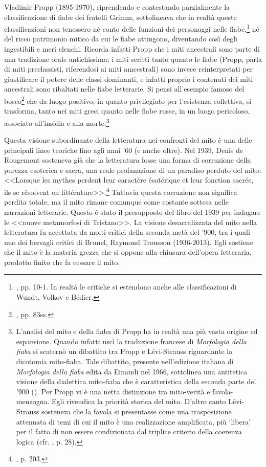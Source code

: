 \documentclass[12pt,a4paper,openright, oneside]{book}
\begin{document}
Vladimir Propp (1895-1970), riprendendo e contestando parzialmente la classificazione di fiabe dei fratelli Grimm, sottolineava che in realtà queste classificazioni non tenessero né conto delle funzioni dei personaggi nelle fiabe,\footnote{\cite{Propp}, pp. 10-1. In realtà le critiche si estendono anche alle classificazioni di Wundt, Volkov e Bédier.}  né del ricco patrimonio mitico da cui le fiabe attingono, diventando così degli ingestibili e meri elenchi. Ricorda infatti Propp che i miti ancestrali sono parte di una tradizione orale antichissima; i miti scritti tanto quanto le fiabe (Propp, parla di miti preclassisti, riferendosi ai miti amcestrali) sono invece reinterpretati per giustificare il potere delle classi dominanti, e infatti proprio i contenuti dei miti ancestrali sono ribaltati nelle fiabe letterarie. Si pensi all'esempio famoso del bosco\footnote{\cite{Propp}, pp. 83ss.} che da luogo positivo, in quanto privilegiato per l'esistenza collettiva, si trasforma, tanto nei miti greci quanto nelle fiabe russe, in un luogo pericoloso, associato all'insidia e alla morte.\footnote{L'analisi del mito e della fiaba di Propp ha in realtà una più vasta origine ed espansione. Quando infatti uscì la traduzione francese di \textit{Morfologia della fiaba} si scaternò un dibattito tra Propp e Lévi-Strauss riguardante la dicotomia mito-fiaba. Tale dibattito, presente nell'edizione italiana di \textit{Morfologia della fiaba} edita da Einaudi nel 1966, sottolinea una antitetica visione della dialettica mito-fiaba che è caratteristica della seconda parte del '900 (\cite{Propp1}). Per Propp vi è una netta distinzione tra mito-verità e favola-menzogna. Egli rivendica la priorità storica del mito. D'altro canto Lévi-Strauss sosteneva che la favola si presentasse come una trasposizione attenuata di temi di cui il mito è una realizzazione amplificata, più `libera' per il fatto di non essere condizionata dal triplice criterio della coerenza logica (cfr. \cite{Jesi}, p. 28).}

Questa visione subordinante della letteratura nei confronti del mito è una delle principali linee teoriche fino agli anni '60 (e anche oltre). Nel 1939, Denis de Rougemont sosteneva già che  la letteratura fosse una forma di corruzione della purezza esoterica e sacra, una reale profanazione di un paradiso perduto del mito: <<Lorsque les mythes perdent leur caractère ésotérique  et leur fonction sacrée, ils se résolvent en littérature>>.\footnote{\cite{Rougemont}, p. 203.} Tuttavia questa corruzione non significa perdita totale, ma il mito rimane comunque come costante sottesa nelle narrazioni letterarie. Questo è stato il presupposto del libro del 1939 per indagare le <<nuove metamorfosi di Tristano>>.  La visione desacralizzata del mito nella letteratura fu accettata da molti critici della seconda metà del '900, tra i quali uno dei bersagli critici di Brunel, Raymond Trousson (1936-2013). Egli sostiene che il mito è la materia grezza che si oppone alla chiusura dell'opera letteraria, prodotto finito che fa cessare il mito. 
\end{document}
